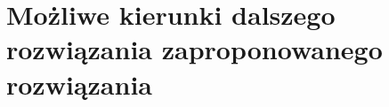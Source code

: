 \section{Możliwe kierunki dalszego rozwiązania zaproponowanego rozwiązania}
\label{sec:przyszlosc}


